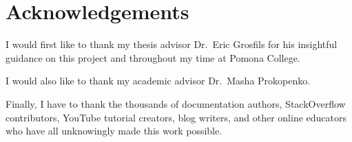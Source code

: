 \chapter{Acknowledgements}
I would first like to thank my thesis advisor Dr.\ Eric Grosfils for his insightful guidance on this project and throughout my time at Pomona College.

I would also like to thank my academic advisor Dr.\ Masha Prokopenko.

Finally, I have to thank the thousands of documentation authors, StackOverflow contributors, YouTube tutorial creators, blog writers, and other online educators who have all unknowingly made this work possible. 